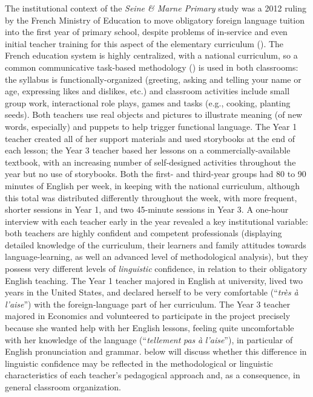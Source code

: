 \documentclass[output=paper,colorlinks,citecolor=brown,modfonts,nonflat]{../langscibook}
\begin{document}
The institutional context of the \textit{Seine \& Marne Primary} study was a 2012 ruling by the French Ministry of Education to move obligatory foreign language tuition into the first year of primary school, despite problems of in-service and even initial teacher training for this aspect of the elementary curriculum (\citealt{YoungMary2010,Mary2014}). The French education system is highly centralized, with a national curriculum, so a common communicative task-based methodology (\citealt{CouncilofEurope2001}) is used in both classrooms: the syllabus is functionally-organized (greeting, asking and telling your name or age, expressing likes and dislikes, etc.) and classroom activities include small group work, interactional role plays, games and tasks (e.g., cooking, planting seeds). Both teachers use real objects and pictures to illustrate meaning (of new words, especially) and puppets to help trigger functional language. The Year 1 teacher created all of her support materials and used storybooks at the end of each lesson; the Year 3 teacher based her lessons on a commercially-available textbook, with an increasing number of self-designed activities throughout the year but no use of storybooks. Both the first- and third-year groups had 80 to 90 minutes of English per week, in keeping with the national curriculum, although this total was distributed differently throughout the week, with more frequent, shorter sessions in Year 1, and two 45-minute sessions in Year 3. A one-hour interview with each teacher early in the year revealed a key institutional variable: both teachers are highly confident and competent professionals (displaying detailed knowledge of the curriculum, their learners and family attitudes towards language-learning, as well an advanced level of methodological analysis), but they possess very different levels of \textit{linguistic} confidence, in relation to their obligatory English teaching. The Year 1 teacher majored in English at university, lived two years in the United States, and declared herself to be very comfortable (“\textit{très} \textit{à} \textit{l’aise}”) with the foreign-language part of her curriculum. The Year 3 teacher majored in Economics and volunteered to participate in the project precisely because she wanted help with her English lessons, feeling quite uncomfortable with her knowledge of the language (“\textit{tellement} \textit{pas} \textit{à} \textit{l’aise}”), in particular of English pronunciation and grammar.  below will discuss whether this difference in linguistic confidence may be reflected in the methodological or linguistic characteristics of each teacher’s pedagogical approach and, as a consequence, in general classroom organization.
\end{document}
